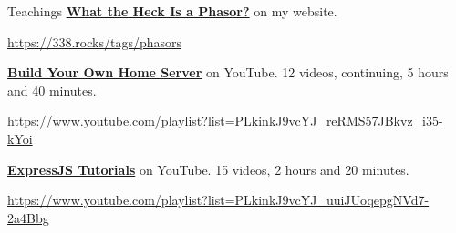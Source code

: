 \begin{rubric}{Teachings}
    \entry*[2025 -- $\cdots$] \textbf{\href{https://338.rocks/tags/phasors}{What the Heck Is a Phasor?}} on my website.
    \par \url{https://338.rocks/tags/phasors}

    \entry*[2023 -- $\cdots$] \textbf{\href{https://www.youtube.com/playlist?list=PLkinkJ9vcYJ_reRMS57JBkvz_i35-kYoi}{Build Your Own Home Server}} on YouTube. 12 videos, continuing, 5 hours and 40 minutes.
    \par \url{https://www.youtube.com/playlist?list=PLkinkJ9vcYJ_reRMS57JBkvz_i35-kYoi}

    \entry*[2020] \textbf{\href{https://www.youtube.com/playlist?list=PLkinkJ9vcYJ_uuiJUoqepgNVd7-2a4Bbg}{ExpressJS Tutorials}} on YouTube. 15 videos, 2 hours and 20 minutes.
    \par \url{https://www.youtube.com/playlist?list=PLkinkJ9vcYJ_uuiJUoqepgNVd7-2a4Bbg}
\end{rubric}
